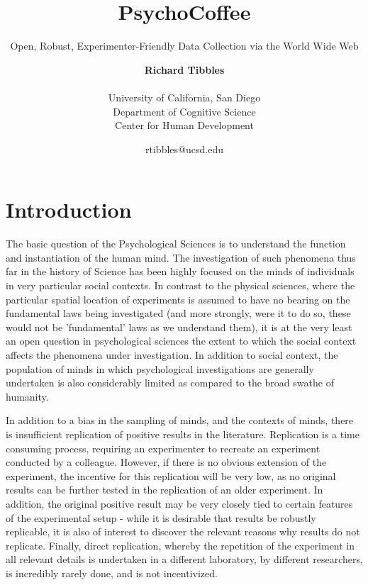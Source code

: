 \documentclass[12pt,a4paper,titlepage]{scrreprt}
\begin{document}
    \title{PsychoCoffee}
    \subtitle{Open, Robust, Experimenter-Friendly Data Collection via the World Wide Web}
    \date{\small{{rtibbles}@ucsd.edu}}
    \author{{\bf Richard Tibbles} \\ \\
                \small{University of California, San Diego} \\
                \small{Department of Cognitive Science} \\
                \small{Center for Human Development}}
    \maketitle
\newpage

\tableofcontents

\newpage

\chapter{Introduction}
    
    The basic question of the Psychological Sciences is to understand the function and instantiation of the human mind. The investigation of such phenomena thus far in the history of Science has been highly focused on the minds of individuals in very particular social contexts. In contrast to the physical sciences, where the particular spatial location of experiments is assumed to have no bearing on the fundamental laws being investigated (and more strongly, were it to do so, these would not be 'fundamental' laws as we understand them), it is at the very least an open question in psychological sciences the extent to which the social context affects the phenomena under investigation. In addition to social context, the population of minds in which psychological investigations are generally undertaken is also considerably limited as compared to the broad swathe of humanity.

    In addition to a bias in the sampling of minds, and the contexts of minds, there is insufficient replication of positive results in the literature. Replication is a time consuming process, requiring an experimenter to recreate an experiment conducted by a colleague. However, if there is no obvious extension of the experiment, the incentive for this replication will be very low, as no original results can be further tested in the replication of an older experiment. In addition, the original positive result may be very closely tied to certain features of the experimental setup - while it is desirable that results be robustly replicable, it is also of interest to discover the relevant reasons why results do not replicate. Finally, direct replication, whereby the repetition of the experiment in all relevant details is undertaken in a different laboratory, by different researchers, is incredibly rarely done, and is not incentivized.
\end{document}
